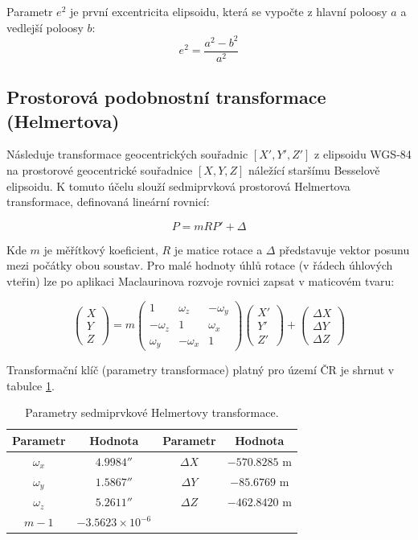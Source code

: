 \documentclass[12pt, a4paper]{article}
\begin{document}
Parametr $e^2$ je první excentricita elipsoidu, která se vypočte z hlavní poloosy $a$ a vedlejší poloosy $b$:
$$e^2 = \frac{a^2 - b^2}{a^2}$$

\subsection{Prostorová podobnostní transformace (Helmertova)}
Následuje transformace geocentrických souřadnic $[X', Y', Z']$ z elipsoidu WGS-84 na prostorové geocentrické souřadnice $[X, Y, Z]$ náležící staršímu Besselově elipsoidu. K tomuto účelu slouží sedmiprvková prostorová Helmertova transformace, definovaná lineární rovnicí:

$$P = m R P' + \Delta$$

Kde $m$ je měřítkový koeficient, $R$ je matice rotace a $\Delta$ představuje vektor posunu mezi počátky obou soustav. Pro malé hodnoty úhlů rotace (v řádech úhlových vteřin) lze po aplikaci Maclaurinova rozvoje rovnici zapsat v maticovém tvaru:

$$\begin{pmatrix} X \\ Y \\ Z \end{pmatrix} = m \begin{pmatrix} 1 & \omega_z & -\omega_y \\ -\omega_z & 1 & \omega_x \\ \omega_y & -\omega_x & 1 \end{pmatrix} \begin{pmatrix} X' \\ Y' \\ Z' \end{pmatrix} + \begin{pmatrix} \Delta X \\ \Delta Y \\ \Delta Z \end{pmatrix}$$

Transformační klíč (parametry transformace) platný pro území ČR je shrnut v tabulce \ref{tab:helmert}.

\begin{table}[h!]
\centering
\begin{tabular}{|c|c||c|c|}
\hline
\textbf{Parametr} & \textbf{Hodnota} & \textbf{Parametr} & \textbf{Hodnota} \\ \hline
$\omega_x$ & $4.9984''$ & $\Delta X$ & $-570.8285 \text{ m}$ \\ \hline
$\omega_y$ & $1.5867''$ & $\Delta Y$ & $-85.6769 \text{ m}$ \\ \hline
$\omega_z$ & $5.2611''$ & $\Delta Z$ & $-462.8420 \text{ m}$ \\ \hline
$m - 1$ & $-3.5623 \times 10^{-6}$ & & \\ \hline
\end{tabular}
\caption{Parametry sedmiprvkové Helmertovy transformace.}
\label{tab:helmert}
\end{table}
\end{document}
